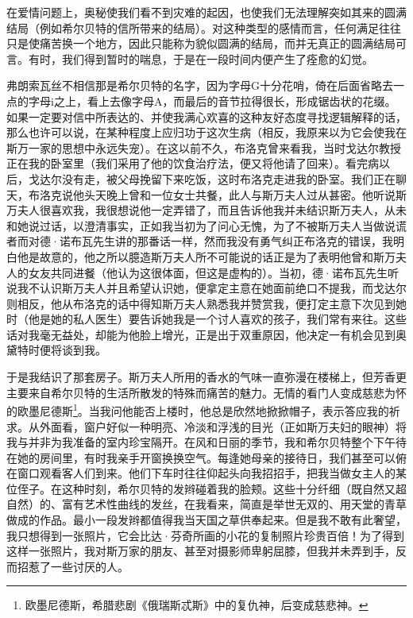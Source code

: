 \par 在爱情问题上，奥秘使我们看不到灾难的起因，也使我们无法理解突如其来的圆满结局（例如希尔贝特的信所带来的结局）。对这种类型的感情而言，任何满足往往只是使痛苦换一个地方，因此只能称为貌似圆满的结局，而并无真正的圆满结局可言。有时，我们得到暂时的喘息，于是在一段时间内便产生了痊愈的幻觉。
\par 弗朗索瓦丝不相信那是希尔贝特的名字，因为字母G十分花哨，倚在后面省略去一点的字母i之上，看上去像字母A，而最后的音节拉得很长，形成锯齿状的花缀。如果一定要对信中所表达的、并使我满心欢喜的这种友好态度寻找逻辑解释的话，那么也许可以说，在某种程度上应归功于这次生病（相反，我原来以为它会使我在斯万一家的思想中永远失宠）。在这以前不久，布洛克曾来看我，当时戈达尔教授正在我的卧室里（我们采用了他的饮食治疗法，便又将他请了回来）。看完病以后，戈达尔没有走，被父母挽留下来吃饭，这时布洛克走进我的卧室。我们正在聊天，布洛克说他头天晚上曾和一位女士共餐，此人与斯万夫人过从甚密。他听说斯万夫人很喜欢我，我很想说他一定弄错了，而且告诉他我并未结识斯万夫人，从未和她说过话，以澄清事实，正如我当初为了问心无愧，为了不被斯万夫人当做说谎者而对德·诺布瓦先生讲的那番话一样，然而我没有勇气纠正布洛克的错误，我明白他是故意的，他之所以臆造斯万夫人所不可能说的话正是为了表明他曾和斯万夫人的女友共同进餐（他认为这很体面，但这是虚构的）。当初，德·诺布瓦先生听说我不认识斯万夫人并且希望认识她，便拿定主意在她面前绝口不提我，而戈达尔则相反，他从布洛克的话中得知斯万夫人熟悉我并赞赏我，便打定主意下次见到她时（他是她的私人医生）要告诉她我是一个讨人喜欢的孩子，我们常有来往。这些话对我毫无益处，却能为他脸上增光，正是出于双重原因，他决定一有机会见到奥黛特时便将谈到我。
\par 于是我结识了那套房子。斯万夫人所用的香水的气味一直弥漫在楼梯上，但芳香更主要来自希尔贝特的生活所散发的特殊而痛苦的魅力。无情的看门人变成慈悲为怀的欧墨尼德斯\footnote{欧墨尼德斯，希腊悲剧《俄瑞斯忒斯》中的复仇神，后变成慈悲神。}。当我问他能否上楼时，他总是欣然地掀掀帽子，表示答应我的祈求。从外面看，窗户好似一种明亮、冷淡和浮浅的目光（正如斯万夫妇的眼神）将我与并非为我准备的室内珍宝隔开。在风和日丽的季节，我和希尔贝特整个下午待在她的房间里，有时我亲手开窗换换空气。每逢她母亲的接待日，我们甚至可以俯在窗口观看客人们到来。他们下车时往往仰起头向我招招手，把我当做女主人的某位侄子。在这种时刻，希尔贝特的发辫碰着我的脸颊。这些十分纤细（既自然又超自然）的、富有艺术性曲线的发丝，在我看来，简直是举世无双的、用天堂的青草做成的作品。最小一段发辫都值得我当天国之草供奉起来。但是我不敢有此奢望，我只想得到一张照片，它会比达·芬奇所画的小花的复制照片珍贵百倍！为了得到这样一张照片，我对斯万家的朋友、甚至对摄影师卑躬屈膝，但我并未弄到手，反而招惹了一些讨厌的人。
